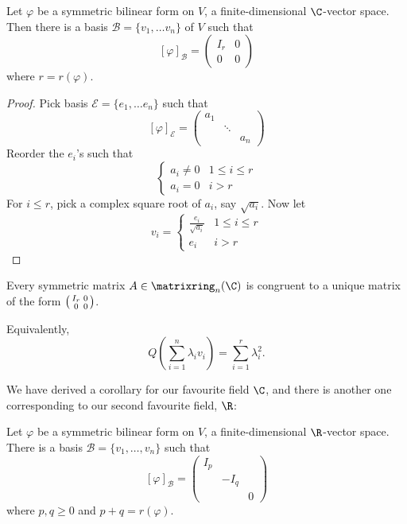 \documentclass[a4paper]{article}
\newcommand*{\M}{\matrixring}
\newcommand*{\basis}{\mathcal}
\theoremstyle{definition}
\begin{document}
\begin{corollary}
  Let \(\varphi\) be a symmetric bilinear form on \(V\), a finite-dimensional \(\C\)-vector space. Then there is a basis \(\basis B = \{v_1, \dots v_n\}\) of \(V\) such that
  \[
    [\varphi]_{\basis B} =
    \begin{pmatrix}
      I_r & 0 \\
      0 & 0
    \end{pmatrix}
  \]
  where \(r = r(\varphi)\).
\end{corollary}

\begin{proof}
  Pick basis \(\basis E = \{e_1, \dots e_n\}\) such that
  \[
    [\varphi]_{\basis E} =
    \begin{pmatrix}
      a_1 & & \\
      & \ddots & \\
      & & a_n
    \end{pmatrix}
  \]
  Reorder the \(e_i\)'s such that
  \[
    \begin{cases}
      a_i \neq 0 & 1 \leq i \leq r \\
      a_i = 0 & i > r
    \end{cases}
  \]
  For \(i \leq r\), pick a complex square root of \(a_i\), say \(\sqrt{a_i}\). Now let
  \[
    v_i =
    \begin{cases}
      \frac{e_i}{\sqrt{a_i}} & 1 \leq i \leq r \\
      e_i & i > r
    \end{cases}
  \]
\end{proof}

\begin{corollary}
  Every symmetric matrix \(A \in \M_n(\C)\) is congruent to a unique matrix of the form \(\begin{psmallmatrix} I_r & 0 \\ 0 & 0 \end{psmallmatrix}\).
\end{corollary}

Equivalently,
\[
  Q \left( \sum_{i = 1}^{n} \lambda_i v_i \right) = \sum_{i = 1}^{r} \lambda_i^2.
\]

We have derived a corollary for our favourite field \(\C\), and there is another one corresponding to our second favourite field, \(\R\):

\begin{corollary}
  Let \(\varphi\) be a symmetric bilinear form on \(V\), a finite-dimensional \(\R\)-vector space. There is a basis \(\basis B = \{v_1, \dots, v_n\}\) such that
  \[
    [\varphi]_{\basis B} =
    \begin{pmatrix}
      I_p & & \\
      & -I_q & \\
      & & 0
    \end{pmatrix}
  \]
  where \(p, q \geq 0\) and \(p + q = r(\varphi)\).
\end{corollary}
\end{document}
